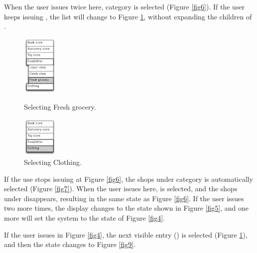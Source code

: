 \documentclass[conference]{IEEEtran}
\def\up{\tsf{▲}}
\def\down{\tsf{▼}}
\begin{document}
When the user issues {\down} twice here,
 category is selected (Figure \ref{fig6}).
%
If the user keeps issuing {\down}, 
the list will change to Figure \ref{fig8},
without expanding the children of .

\begin{figure}[H]
  \begin{minipage}{0.45\hsize}
    \centerline{\includegraphics[width=17mm,bb=0 0 139 238]{figures/fig6.pdf}}
    \caption{Selecting Fresh grocery.}
    \label{fig6}
  \end{minipage}
  \begin{minipage}{0.45\hsize}
    \centerline{\includegraphics[width=17mm,bb=0 0 139 157]{figures/fig8.pdf}}
    \caption{Selecting Clothing.}
    \label{fig8}
  \end{minipage}
\end{figure}

If the use stops issuing {\down} at Figure \ref{fig6},
the shops under category  is automatically selected (Figure \ref{fig7}).
%
When the user issues {\up} here,  is selected,
and the shops under  disappears, 
resulting in the same state as Figure \ref{fig6}.
If the user issues {\up} two more times, the display changes to the state
shown in Figure \ref{fig5},
and one more {\up} will set the system to the state of Figure \ref{fig4}.

If the user issues {\down} in Figure \ref{fig4}, the next visible entry
() is selected (Figure \ref{fig8}), and then the state changes to Figure \ref{fig9}.
\end{document}
